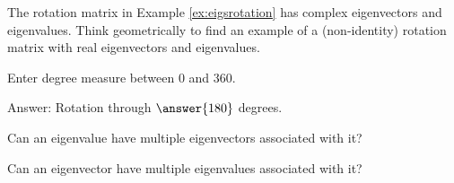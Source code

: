 \documentclass{ximera}
\begin{document}
\begin{problem}\label{prob:rotmatrixrealeig1}The rotation matrix in Example \ref{ex:eigsrotation} has complex eigenvectors and eigenvalues.  Think geometrically to find an example of a (non-identity) rotation matrix with real eigenvectors and eigenvalues. 
    
Enter degree measure between 0 and 360.
    
Answer:  Rotation through $\answer{180}$ degrees.
\end{problem}
    
\begin{problem}\label{prob:eigenmultchoice}
Can an eigenvalue have multiple eigenvectors associated with it?
\begin{multipleChoice}
    \end{multipleChoice}
        
    Can an eigenvector have multiple eigenvalues associated with it?
    \begin{multipleChoice}
    \end{multipleChoice}
\end{problem}
\end{document}
